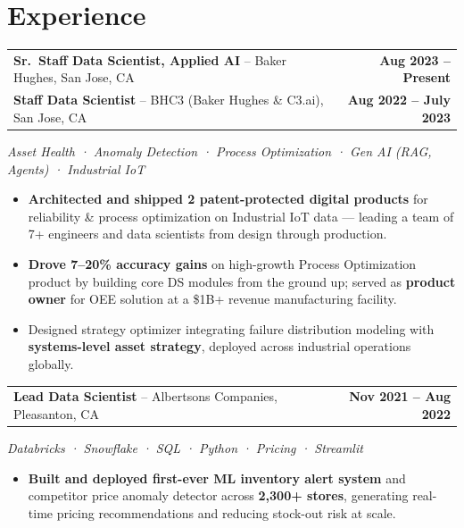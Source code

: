 \documentclass[10pt, letterpaper]{article}
\newcommand{\jobtitle}[1]{\textbf{#1}}
\newcommand{\employer}[1]{\textcolor{subtext}{#1}}
\newcommand{\daterange}[1]{\textbf{\textcolor{accent}{#1}}}
\newcommand{\techtags}[1]{\textit{\small\textcolor{subtext}{#1}}}
\begin{document}
\section{Experience}

\noindent\begin{tabularx}{\linewidth}{@{}X r@{}}
  \jobtitle{Sr.\ Staff Data Scientist, Applied AI} \employer{-- Baker Hughes, San Jose, CA} & \daterange{Aug 2023 -- Present} \\[-1pt]
  \jobtitle{Staff Data Scientist} \employer{-- BHC3 (Baker Hughes \& C3.ai), San Jose, CA} & \daterange{Aug 2022 -- July 2023}
\end{tabularx}
\techtags{Asset Health · Anomaly Detection · Process Optimization · Gen AI (RAG, Agents) · Industrial IoT}
\begin{itemize}\small
  \item \textbf{Architected and shipped 2 patent-protected digital products} for reliability \& process optimization on Industrial IoT data — leading a team of 7+ engineers and data scientists from design through production.
  \item \textbf{Drove 7--20\% accuracy gains} on high-growth Process Optimization product by building core DS modules from the ground up; served as \textbf{product owner} for OEE solution at a \$1B+ revenue manufacturing facility.
  \item Designed strategy optimizer integrating failure distribution modeling with \textbf{systems-level asset strategy}, deployed across industrial operations globally.
\end{itemize}

\vspace{9pt}
\noindent\begin{tabularx}{\linewidth}{@{}X r@{}}
  \jobtitle{Lead Data Scientist} \employer{-- Albertsons Companies, Pleasanton, CA} & \daterange{Nov 2021 -- Aug 2022}
\end{tabularx}
\techtags{Databricks · Snowflake · SQL · Python · Pricing · Streamlit}
\begin{itemize}\small
  \item \textbf{Built and deployed first-ever ML inventory alert system} and competitor price anomaly detector across \textbf{2,300+ stores}, generating real-time pricing recommendations and reducing stock-out risk at scale.
\end{itemize}
\end{document}
